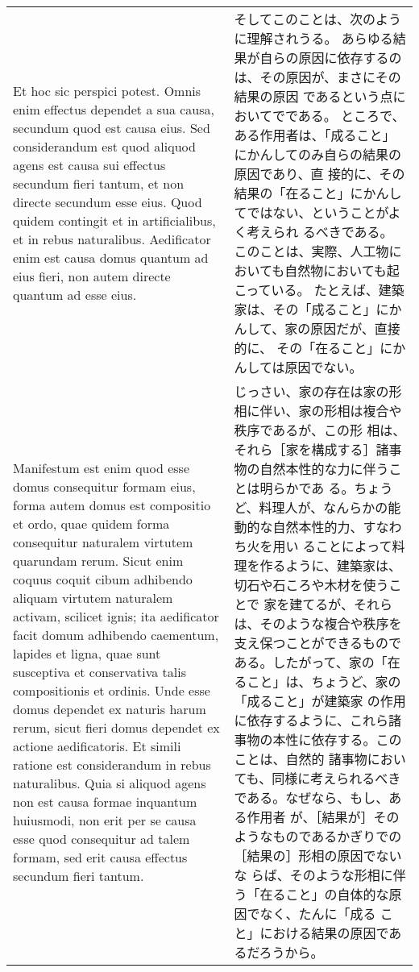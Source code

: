 \documentclass[10pt]{jsarticle} %
\begin{document}
\begin{longtable}{p{21em}p{21em}}
\\

Et hoc sic perspici potest. Omnis enim effectus
dependet a sua causa, secundum quod est causa eius. Sed considerandum
est quod aliquod agens est causa sui effectus secundum fieri tantum, et
non directe secundum esse eius. Quod quidem contingit et in
artificialibus, et in rebus naturalibus. Aedificator enim est causa
domus quantum ad eius fieri, non autem directe quantum ad esse
eius.



&

そしてこのことは、次のように理解されうる。
あらゆる結果が自らの原因に依存するのは、その原因が、まさにその結果の原因
 であるという点においてでである。
ところで、ある作用者は、「成ること」にかんしてのみ自らの結果の原因であり、直
 接的に、その結果の「在ること」にかんしてではない、ということがよく考えられ
 るべきである。
このことは、実際、人工物においても自然物においても起こっている。
たとえば、建築家は、その「成ること」にかんして、家の原因だが、直接的に、
 その「在ること」にかんしては原因でない。

\\


Manifestum est enim quod esse domus consequitur formam eius, forma
autem domus est compositio et ordo, quae quidem forma consequitur
naturalem virtutem quarundam rerum. Sicut enim coquus coquit cibum
adhibendo aliquam virtutem naturalem activam, scilicet ignis; ita
aedificator facit domum adhibendo caementum, lapides et ligna, quae sunt
susceptiva et conservativa talis compositionis et ordinis. Unde esse
domus dependet ex naturis harum rerum, sicut fieri domus dependet ex
actione aedificatoris. Et simili ratione est considerandum in rebus
naturalibus. Quia si aliquod agens non est causa formae inquantum
huiusmodi, non erit per se causa esse quod consequitur ad talem formam,
sed erit causa effectus secundum fieri tantum.



&

じっさい、家の存在は家の形相に伴い、家の形相は複合や秩序であるが、この形
 相は、それら［家を構成する］諸事物の自然本性的な力に伴うことは明らかであ
 る。ちょうど、料理人が、なんらかの能動的な自然本性的力、すなわち火を用い
 ることによって料理を作るように、建築家は、切石や石ころや木材を使うことで
 家を建てるが、それらは、そのような複合や秩序を支え保つことができるもので
 ある。したがって、家の「在ること」は、ちょうど、家の「成ること」が建築家
 の作用に依存するように、これら諸事物の本性に依存する。このことは、自然的
 諸事物においても、同様に考えられるべきである。なぜなら、もし、ある作用者
 が、［結果が］そのようなものであるかぎりでの［結果の］形相の原因でないな
 らば、そのような形相に伴う「在ること」の自体的な原因でなく、たんに「成る
 こと」における結果の原因であるだろうから。



\end{longtable}
\end{document}
